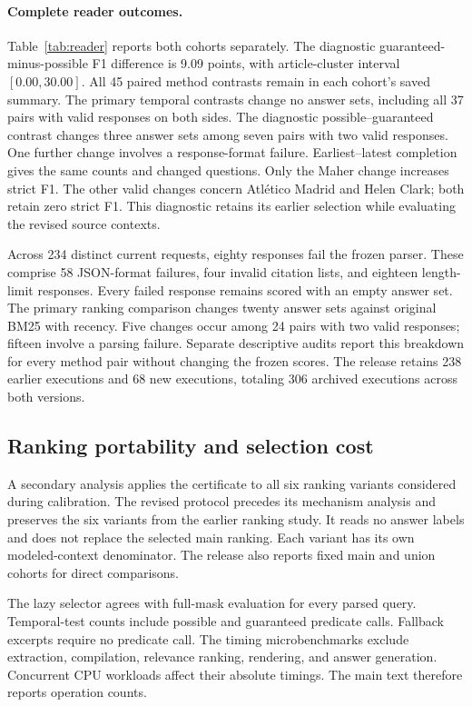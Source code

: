 \paragraph{Complete reader outcomes.}
Table~\ref{tab:reader} reports both cohorts separately.
The diagnostic guaranteed-minus-possible F1 difference is 9.09 points, with article-cluster interval $[0.00,30.00]$.
All 45 paired method contrasts remain in each cohort's saved summary.
The primary temporal contrasts change no answer sets, including all 37 pairs with valid responses on both sides.
The diagnostic possible--guaranteed contrast changes three answer sets among seven pairs with two valid responses.
One further change involves a response-format failure.
Earliest--latest completion gives the same counts and changed questions.
Only the Maher change increases strict F1.
The other valid changes concern Atl\'etico Madrid and Helen Clark; both retain zero strict F1.
This diagnostic retains its earlier selection while evaluating the revised source contexts.

Across 234 distinct current requests, eighty responses fail the frozen parser.
These comprise 58 JSON-format failures, four invalid citation lists, and eighteen length-limit responses.
Every failed response remains scored with an empty answer set.
The primary ranking comparison changes twenty answer sets against original BM25 with recency.
Five changes occur among 24 pairs with two valid responses; fifteen involve a parsing failure.
Separate descriptive audits report this breakdown for every method pair without changing the frozen scores.
The release retains 238 earlier executions and 68 new executions, totaling 306 archived executions across both versions.

\subsection{Ranking portability and selection cost}
A secondary analysis applies the certificate to all six ranking variants considered during calibration.
The revised protocol precedes its mechanism analysis and preserves the six variants from the earlier ranking study.
It reads no answer labels and does not replace the selected main ranking.
Each variant has its own modeled-context denominator.
The release also reports fixed main and union cohorts for direct comparisons.

The lazy selector agrees with full-mask evaluation for every parsed query.
Temporal-test counts include possible and guaranteed predicate calls.
Fallback excerpts require no predicate call.
The timing microbenchmarks exclude extraction, compilation, relevance ranking, rendering, and answer generation.
Concurrent CPU workloads affect their absolute timings.
The main text therefore reports operation counts.

